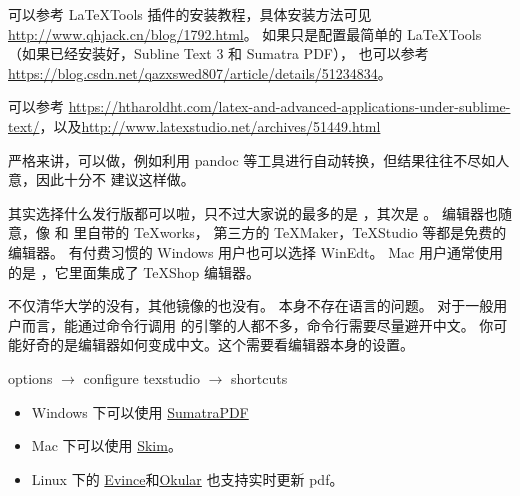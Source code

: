 可以参考 LaTeXTools 插件的安装教程，具体安装方法可见 \url{http://www.qhjack.cn/blog/1792.html}。
如果只是配置最简单的 LaTeXTools （如果已经安装好\TeXLive{}，Subline Text 3 和 Sumatra PDF），
也可以参考 \url{https://blog.csdn.net/qazxswed807/article/details/51234834}。



可以参考 \url{https://htharoldht.com/latex-and-advanced-applications-under-sublime-text/}，以及\url{http://www.latexstudio.net/archives/51449.html}



严格来讲，可以做，例如利用 pandoc 等工具进行自动转换，但结果往往不尽如人意，因此十分不
建议这样做。



其实选择什么发行版都可以啦，只不过大家说的最多的是 \TeXLive{}，其次是 \MiKTeX{}。
编辑器也随意，像 \TeXLive{} 和 \MiKTeX{} 里自带的 TeXworks，
第三方的 TeXMaker，TeXStudio 等都是免费的编辑器。
有付费习惯的 Windows 用户也可以选择 WinEdt。
Mac 用户通常使用的是 \MacTeX{}，它里面集成了 TeXShop 编辑器。



不仅清华大学的没有，其他镜像的也没有。\TeXLive{} 本身不存在语言的问题。
对于一般用户而言，能通过命令行调用 \TeXLive{} 的引擎的人都不多，命令行需要尽量避开中文。
你可能好奇的是编辑器如何变成中文。这个需要看编辑器本身的设置。



options $\to$ configure texstudio $\to$ shortcuts



\begin{itemize}
  \item Windows 下可以使用 \href{https://www.sumatrapdfreader.org/free-pdf-reader.html}{SumatraPDF}
  \item Mac 下可以使用 \href{http://skim-app.sourceforge.net/}{Skim}。
  \item Linux 下的 \href{https://gitlab.gnome.org/GNOME/evince}{Evince}和\href{https://okular.kde.org/}{Okular} 也支持实时更新 pdf。
\end{itemize}


